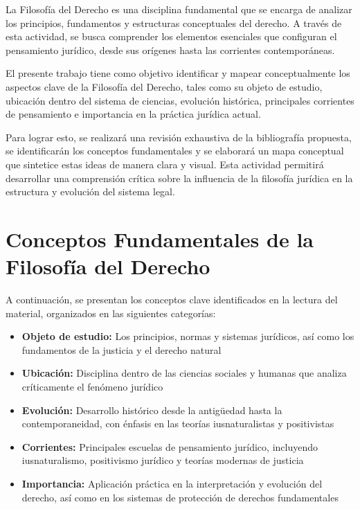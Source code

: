 \documentclass[
	spanish, %
	letterpaper, oneside
]{article}
\begin{document}
\begin{flushleft}
La Filosofía del Derecho es una disciplina fundamental que se encarga de analizar los principios, fundamentos y estructuras conceptuales del derecho. A través de esta actividad, se busca comprender los elementos esenciales que configuran el pensamiento jurídico, desde sus orígenes hasta las corrientes contemporáneas.

El presente trabajo tiene como objetivo identificar y mapear conceptualmente los aspectos clave de la Filosofía del Derecho, tales como su objeto de estudio, ubicación dentro del sistema de ciencias, evolución histórica, principales corrientes de pensamiento e importancia en la práctica jurídica actual.

Para lograr esto, se realizará una revisión exhaustiva de la bibliografía propuesta, se identificarán los conceptos fundamentales y se elaborará un mapa conceptual que sintetice estas ideas de manera clara y visual. Esta actividad permitirá desarrollar una comprensión crítica sobre la influencia de la filosofía jurídica en la estructura y evolución del sistema legal.
\end{flushleft}

\section{Conceptos Fundamentales de la Filosofía del Derecho}

A continuación, se presentan los conceptos clave identificados en la lectura del material, organizados en las siguientes categorías:

\begin{itemize}
	\item \textbf{Objeto de estudio:} Los principios, normas y sistemas jurídicos, así como los fundamentos de la justicia y el derecho natural \cite{finnis_estudios_2017,lovon_manual_2020}
	\item \textbf{Ubicación:} Disciplina dentro de las ciencias sociales y humanas que analiza críticamente el fenómeno jurídico \cite{ruiz_rodriguez_filosofia_derecho_2009}
	\item \textbf{Evolución:} Desarrollo histórico desde la antigüedad hasta la contemporaneidad, con énfasis en las teorías iusnaturalistas y positivistas
	\item \textbf{Corrientes:} Principales escuelas de pensamiento jurídico, incluyendo iusnaturalismo, positivismo jurídico y teorías modernas de justicia \cite{finnis_estudios_2017,ruiz_rodriguez_filosofia_derecho_2009,lovon_manual_2020}
	\item \textbf{Importancia:} Aplicación práctica en la interpretación y evolución del derecho, así como en los sistemas de protección de derechos fundamentales \cite{noauthor_constitucion_nodate,generales_ley_2021}
\end{itemize}
\end{document}
